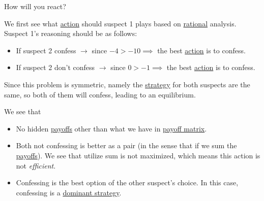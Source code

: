 \begin{eg}
\begin{itemize}
\begin{table}[H]
		      \end{table}
	\end{itemize}
	\begin{problem}
	How will you react?
	\end{problem}
	\begin{answer}
		We first see what \hyperref[def:strategy]{action} should suspect 1 plays based on \hyperref[rationality]{rational} analysis. Suspect 1's reasoning should be as follows:
		\begin{itemize}
			\item If suspect 2 confess \(\to \) since \(-4> -10 \implies\) the best \hyperref[def:strategy]{action} is to confess.
			\item If suspect 2 don't confess \(\to \) since \(0>-1 \implies\) the best \hyperref[def:strategy]{action} is to confess.
		\end{itemize}
		Since this problem is symmetric, namely the \hyperref[def:strategy]{strategy} for both suspects are the same, so both of them will confess, leading to an equilibrium.
	\end{answer}
	\begin{remark}
		We see that
		\begin{itemize}
			\item No hidden \hyperref[def:reward]{payoffs} other than what we have in \hyperref[def:payoff-matrix]{payoff matrix}.
			\item Both not confessing is better as a pair (in the sense that if we sum the \hyperref[def:reward]{payoffs}). We see that utilize sum is not maximized, which means this action is not \emph{efficient}.
			\item Confessing is the best option of the other suspect's choice. In this case, confessing is a \hyperref[def:dominant-strategy]{dominant strategy}.
		\end{itemize}
	\end{remark}
\end{eg}

